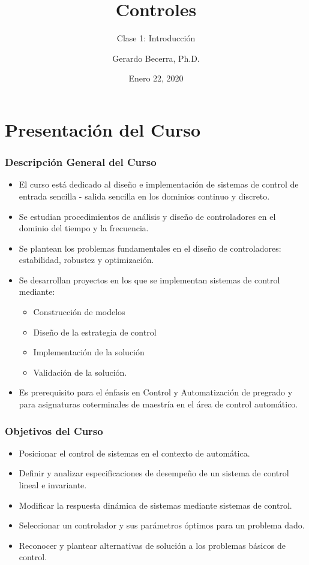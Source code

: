 \documentclass[aspectratio=169,handout]{beamer}
\title{Controles}
\subtitle{Clase 1: Introducción}
\author{Gerardo Becerra, Ph.D.}
\institute{Pontificia Universidad Javeriana\\ Departamento de Electrónica}
\date{Enero 22, 2020}
\theoremstyle{definition}
\theoremstyle{plain}
\theoremstyle{remark}
\begin{document}
\frame{\titlepage}	


\section{Presentación del Curso}
\begin{frame}[<+->]\frametitle{Descripción General del Curso}
\begin{itemize}
  \item El curso está dedicado al diseño e implementación de sistemas de control de entrada sencilla - salida sencilla en los dominios continuo y discreto.
  \item Se estudian procedimientos de análisis y diseño de controladores en el dominio del tiempo y la frecuencia.
  \item Se plantean los problemas fundamentales en el diseño de controladores: estabilidad, robustez y optimización.
  \item Se desarrollan proyectos en los que se implementan sistemas de control mediante:
  \begin{itemize}
    \item Construcción de modelos
    \item Diseño de la estrategia de control
    \item Implementación de la solución
    \item Validación de la solución.
  \end{itemize}
  \item Es prerequisito para el énfasis en Control y Automatización de pregrado y para asignaturas coterminales de maestría en el área de control automático.
\end{itemize}
\end{frame}

\begin{frame}[c]\frametitle{Objetivos del Curso}
\begin{itemize}
  \item Posicionar el control de sistemas en el contexto de automática.
  \item Definir y analizar especificaciones de desempeño de un sistema de control lineal e invariante.
  \item Modificar la respuesta dinámica de sistemas mediante sistemas de control.
  \item Seleccionar un controlador y sus parámetros óptimos para un problema dado.
  \item Reconocer y plantear alternativas de solución a los problemas básicos de control.
\end{itemize}
\end{frame}
\end{document}
